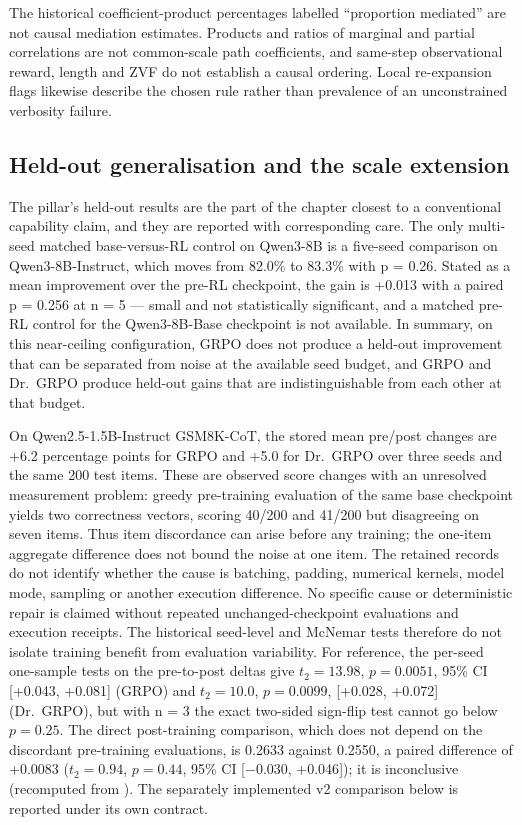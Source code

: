 \documentclass[12pt,a4paper]{report}
\DeclareRobustCommand{\longtok}[1]{\texttt{\seqsplit{#1}}}
\begin{document}
The historical coefficient-product percentages labelled ``proportion
mediated'' are not causal mediation estimates. Products and ratios of
marginal and partial correlations are not common-scale path
coefficients, and same-step observational reward, length and ZVF do not
establish a causal ordering. Local re-expansion flags likewise describe
the chosen rule rather than prevalence of an unconstrained verbosity
failure.

\subsection{Held-out generalisation and the scale
extension}\label{held-out-generalisation-and-the-scale-extension}

The pillar's held-out results are the part of the chapter closest to a
conventional capability claim, and they are reported with corresponding
care. The only multi-seed matched base-versus-RL control on Qwen3-8B is
a five-seed comparison on Qwen3-8B-Instruct, which moves from 82.0\% to
83.3\% with p = 0.26. Stated as a mean improvement over the pre-RL
checkpoint, the gain is +0.013 with a paired p = 0.256 at n = 5 ---
small and not statistically significant, and a matched pre-RL control
for the Qwen3-8B-Base checkpoint is not available. In summary, on this
near-ceiling configuration, GRPO does not produce a held-out improvement
that can be separated from noise at the available seed budget, and GRPO
and Dr.~GRPO produce held-out gains that are indistinguishable from each
other at that budget.

On Qwen2.5-1.5B-Instruct GSM8K-CoT, the stored mean pre/post changes are
+6.2 percentage points for GRPO and +5.0 for Dr.~GRPO over three seeds
and the same 200 test items. These are observed score changes with an
unresolved measurement problem: greedy pre-training evaluation of the
same base checkpoint yields two correctness vectors, scoring 40/200 and
41/200 but disagreeing on seven items. Thus item discordance can arise
before any training; the one-item aggregate difference does not bound
the noise at one item. The retained records do not identify whether the
cause is batching, padding, numerical kernels, model mode, sampling or
another execution difference. No specific cause or deterministic repair
is claimed without repeated unchanged-checkpoint evaluations and
execution receipts. The historical seed-level and McNemar tests
therefore do not isolate training benefit from evaluation variability.
For reference, the per-seed one-sample tests on the pre-to-post deltas
give \(t_2 = 13.98\), \(p = 0.0051\), 95\% CI {[}+0.043, +0.081{]}
(GRPO) and \(t_2 = 10.0\), \(p = 0.0099\), {[}+0.028, +0.072{]}
(Dr.~GRPO), but with n = 3 the exact two-sided sign-flip test cannot go
below \(p = 0.25\). The direct post-training comparison, which does not
depend on the discordant pre-training evaluations, is 0.2633 against
0.2550, a paired difference of +0.0083 (\(t_2 = 0.94\), \(p = 0.44\),
95\% CI {[}−0.030, +0.046{]}); it is inconclusive (recomputed from
\longtok{drgrpo\_\allowbreak{}gsm8k\_\allowbreak{}cot\_\allowbreak{}full.json}). The separately implemented v2
comparison below is reported under its own contract.
\end{document}
